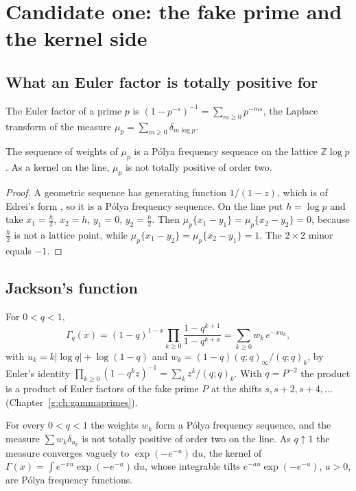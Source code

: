 \section{Candidate one: the fake prime and the kernel side}\label{c:sec:kernel}

\subsection{What an Euler factor is totally positive for}

The Euler factor of a prime $p$ is $(1-p^{-s})^{-1}=\sum_{m\ge0}p^{-ms}$, the Laplace transform of the measure $\mu_p=\sum_{m\ge0}\delta_{m\log p}$.

\begin{proposition}\label{c:prop:lattice}
The sequence of weights of $\mu_p$ is a P\'olya frequency sequence on the lattice $\mathbb Z\log p$. As a kernel on the line, $\mu_p$ is not totally positive of order two.
\end{proposition}

\begin{proof}
A geometric sequence has generating function $1/(1-z)$, which is of Edrei's form \cite{Edrei53}, so it is a P\'olya frequency sequence. On the line put $h=\log p$ and take $x_1=\frac h2$, $x_2=h$, $y_1=0$, $y_2=\frac h2$. Then $\mu_p\{x_1-y_1\}=\mu_p\{x_2-y_2\}=0$, because $\frac h2$ is not a lattice point, while $\mu_p\{x_1-y_2\}=\mu_p\{x_2-y_1\}=1$. The $2\times2$ minor equals $-1$.
\end{proof}

\subsection{Jackson's function}

For $0<q<1$,
\[
\Gamma_q(x)=(1-q)^{1-x}\prod_{k\ge0}\frac{1-q^{k+1}}{1-q^{k+x}}=\sum_{k\ge0}w_k\,e^{-xu_k},
\]
with $u_k=k|\log q|+\log(1-q)$ and $w_k=(1-q)(q;q)_\infty/(q;q)_k$, by Euler's identity $\prod_{k\ge0}(1-q^kz)^{-1}=\sum_kz^k/(q;q)_k$. With $q=P^{-2}$ the product is a product of Euler factors of the fake prime $P$ at the shifts $s,s+2,s+4,\dots$ (Chapter~\ref{g:ch:gammaprimes}).

\begin{proposition}\label{c:prop:jackson}
For every $0<q<1$ the weights $w_k$ form a P\'olya frequency sequence, and the measure $\sum w_k\delta_{u_k}$ is not totally positive of order two on the line. As $q\uparrow1$ the measure converges vaguely to $\exp(-e^{-u})\,\mathrm{d}u$, the kernel of $\Gamma(x)=\int e^{-xu}\exp(-e^{-u})\,\mathrm{d}u$, whose integrable tilts $e^{-au}\exp(-e^{-u})$, $a>0$, are P\'olya frequency functions.
\end{proposition}

